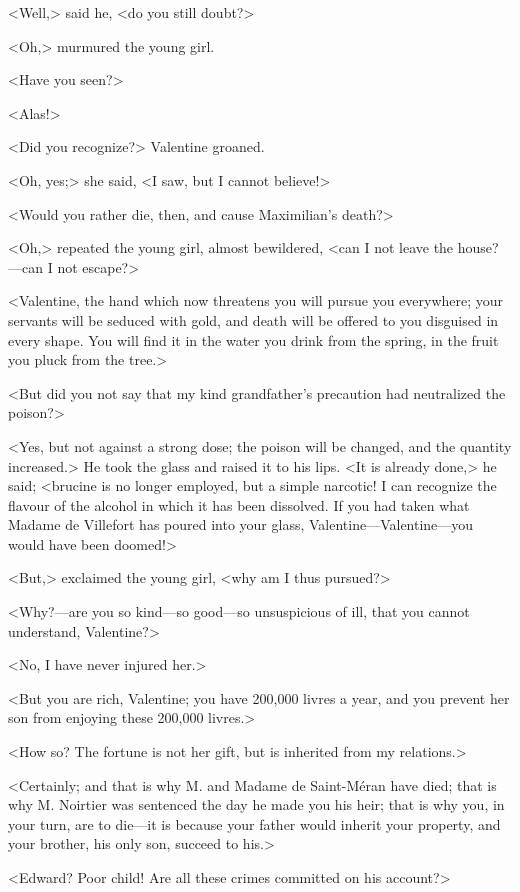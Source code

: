  <Well,> said he, <do you still doubt?> 

 <Oh,> murmured the young girl. 

 <Have you seen?> 

 <Alas!> 

 <Did you recognize?> Valentine groaned. 

 <Oh, yes;> she said, <I saw, but I cannot believe!> 

 <Would you rather die, then, and cause Maximilian's death?> 

 <Oh,> repeated the young girl, almost bewildered, <can I not leave the house?—can I not escape?> 

 <Valentine, the hand which now threatens you will pursue you everywhere; your servants will be seduced with gold, and death will be offered to you disguised in every shape. You will find it in the water you drink from the spring, in the fruit you pluck from the tree.> 

 <But did you not say that my kind grandfather's precaution had neutralized the poison?> 

 <Yes, but not against a strong dose; the poison will be changed, and the quantity increased.> He took the glass and raised it to his lips. <It is already done,> he said; <brucine is no longer employed, but a simple narcotic! I can recognize the flavour of the alcohol in which it has been dissolved. If you had taken what Madame de Villefort has poured into your glass, Valentine—Valentine—you would have been doomed!> 

 <But,> exclaimed the young girl, <why am I thus pursued?> 

 <Why?—are you so kind—so good—so unsuspicious of ill, that you cannot understand, Valentine?> 

 <No, I have never injured her.> 

 <But you are rich, Valentine; you have 200,000 livres a year, and you prevent her son from enjoying these 200,000 livres.> 

 <How so? The fortune is not her gift, but is inherited from my relations.> 

 <Certainly; and that is why M. and Madame de Saint-Méran have died; that is why M. Noirtier was sentenced the day he made you his heir; that is why you, in your turn, are to die—it is because your father would inherit your property, and your brother, his only son, succeed to his.> 

 <Edward? Poor child! Are all these crimes committed on his account?> 

